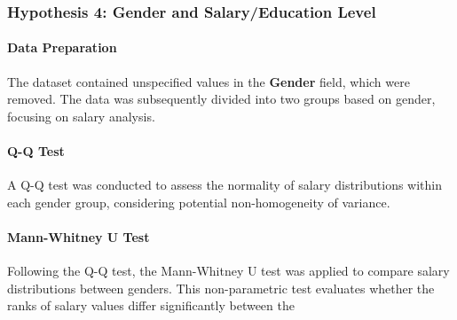 \subsubsection{Hypothesis 4: Gender and Salary/Education Level}

\paragraph{Data Preparation}
The dataset contained unspecified values in the \textbf{Gender} field, which were removed. The data was subsequently divided into two groups based on gender, focusing on salary analysis.

\paragraph{Q-Q Test}
A Q-Q test was conducted to assess the normality of salary distributions within each gender group, considering potential non-homogeneity of variance.

\paragraph{Mann-Whitney U Test}
Following the Q-Q test, the Mann-Whitney U test was applied to compare salary distributions between genders. This non-parametric test evaluates whether the ranks of salary values differ significantly between the
